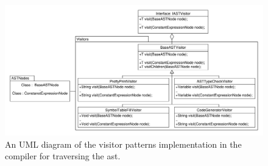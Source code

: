 \begin{figure}[!ht]
\centering
 \includegraphics[width=1\textwidth]{figures/ClassDiagrams/Visitors.pdf} %
\caption{An UML diagram of the visitor patterns implementation in the compiler for traversing the \acrshort{ast}.}\label{image:Visitors}
\vspace{-15pt}
\end{figure} 